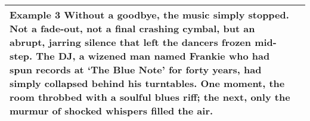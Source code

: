\begin{table*}[t]
{\begin{tabular}{p{} | p{}}
\textbf{Example 3} \newline
Without a goodbye, the music simply stopped. Not a fade-out, not a final crashing cymbal, but an abrupt, jarring silence that left the dancers frozen mid-step. The DJ, a wizened man named Frankie who had spun records at `The Blue Note' for forty years, had simply collapsed behind his turntables. One moment, the room throbbed with a soulful blues riff; the next, only the murmur of shocked whispers filled the air. \\


\bottomrule
\end{tabular}
}
\end{table*}








